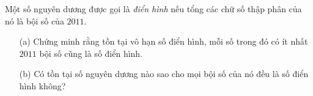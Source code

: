 \ifshowproblem
\begin{problem}\label{example:ROU-2015-MO-8-P4}
    Một số nguyên dương được gọi là \textit{điển hình} nếu tổng các chữ số thập phân của nó là bội số của \(2011\).

    \begin{itemize}
        \item[(a)] Chứng minh rằng tồn tại vô hạn số điển hình, mỗi số trong đó có ít nhất \(2011\) bội số cũng là số điển hình.
        \item[(b)] Có tồn tại số nguyên dương nào sao cho mọi bội số của nó đều là số điển hình không?
    \end{itemize}
\end{problem}
\fi

\fi